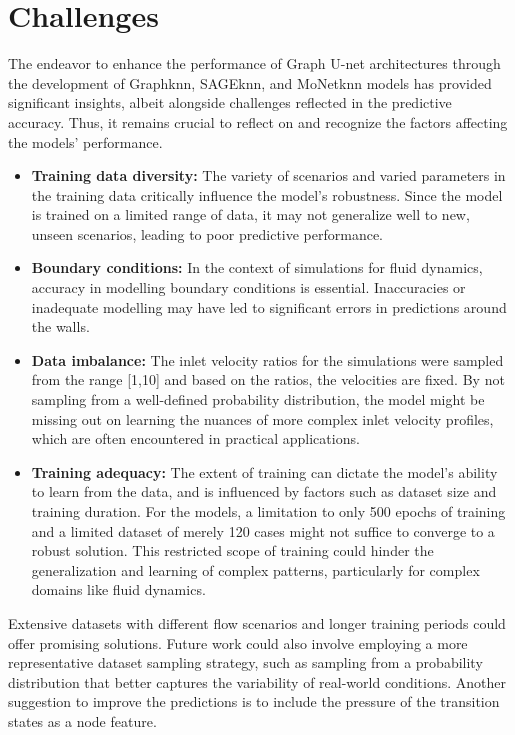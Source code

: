 \section{Challenges}
The endeavor to enhance the performance of Graph U-net architectures through the development of Graphknn, SAGEknn, and MoNetknn models has provided significant insights, albeit alongside challenges reflected in the predictive accuracy. Thus, it remains crucial to reflect on and recognize the factors affecting the models' performance. 
\begin{itemize}
\item \textbf{Training data diversity:} The variety of scenarios and varied parameters in the training data critically influence the model's robustness. Since the model is trained on a limited range of data, it may not generalize well to new, unseen scenarios, leading to poor predictive performance.
\item \textbf{Boundary conditions:} In the context of simulations for fluid dynamics, accuracy in modelling boundary conditions is essential. Inaccuracies or inadequate modelling may have led to significant errors in predictions around the walls.
\item \textbf{Data imbalance:} The inlet velocity ratios for the simulations were sampled from the range [1,10] and based on the ratios, the velocities are fixed. By not sampling from a well-defined probability distribution, the model might be missing out on learning the nuances of more complex inlet velocity profiles, which are often encountered in practical applications.
\item \textbf{Training adequacy:} The extent of training can dictate the model's ability to learn from the data, and is influenced by factors such as dataset size and training duration. For the models, a limitation to only 500 epochs of training and a limited dataset of merely 120 cases might not suffice to converge to a robust solution. This restricted scope of training could hinder the generalization and learning of complex patterns, particularly for complex domains like fluid dynamics.
\end{itemize}
Extensive datasets with different flow scenarios and longer training periods could offer promising solutions. Future work could also involve employing a more representative dataset sampling strategy, such as sampling from a probability distribution that better captures the variability of real-world conditions. Another suggestion to improve the predictions is to include the pressure of the transition states as a node feature. \\
